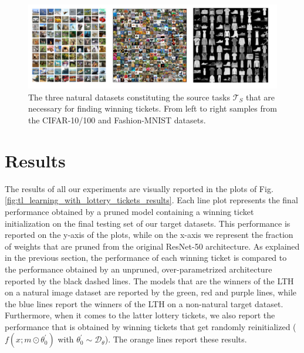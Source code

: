 \begin{figure}
  \centering
   \includegraphics[width=\linewidth,height=\textheight,keepaspectratio]{./Images/Chapter06/natural_datasets.png}
   \caption{The three natural datasets constituting the source tasks $\mathcal{T}_S$ that are necessary for finding winning tickets. From left to right samples from the CIFAR-10/100 and Fashion-MNIST datasets.}
\label{fig:natural_source_datasets}
\end{figure}


\section{Results}
\label{sec:results}
The results of all our experiments are visually reported in the plots of Fig. \ref{fig:tl_learning_with_lottery_tickets_results}. Each line plot represents the final performance obtained by a pruned model containing a winning ticket initialization on the final testing set of our target datasets. This performance is reported on the y-axis of the plots, while on the x-axis we represent the fraction of weights that are pruned from the original ResNet-50 architecture. As explained in the previous section, the performance of each winning ticket is compared to the performance obtained by an unpruned, over-parametrized architecture reported by the black dashed lines. The models that are the winners of the LTH on a natural image dataset are reported by the green, red and purple lines, while the blue lines report the winners of the LTH on a non-natural target dataset. Furthermore, when it comes to the latter lottery tickets, we also report the performance that is obtained by winning tickets that get randomly reinitialized ($f(x;m\odot\theta^{'}_{0})$ with $\theta^{'}_{0} \sim \mathcal{D}_\theta$). The orange lines report these results. 

